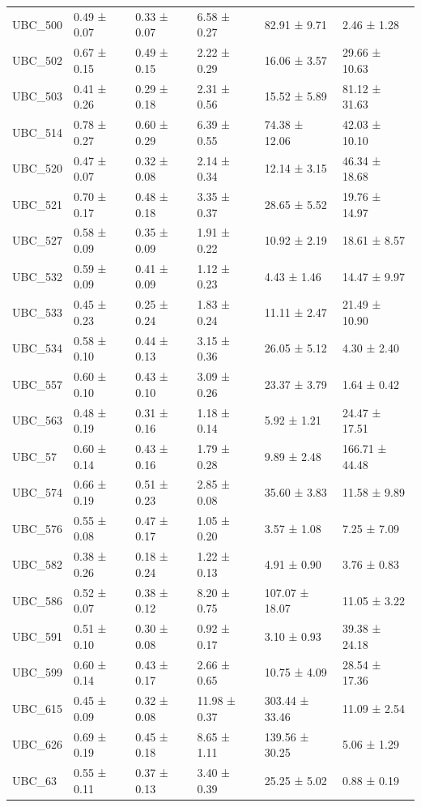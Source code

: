\begin{tabular}{llllll}
UBC_500 & 0.49 ± 0.07 & 0.33 ± 0.07 & 6.58 ± 0.27 & 82.91 ± 9.71 & 2.46 ± 1.28 \\
UBC_502 & 0.67 ± 0.15 & 0.49 ± 0.15 & 2.22 ± 0.29 & 16.06 ± 3.57 & 29.66 ± 10.63 \\
UBC_503 & 0.41 ± 0.26 & 0.29 ± 0.18 & 2.31 ± 0.56 & 15.52 ± 5.89 & 81.12 ± 31.63 \\
UBC_514 & 0.78 ± 0.27 & 0.60 ± 0.29 & 6.39 ± 0.55 & 74.38 ± 12.06 & 42.03 ± 10.10 \\
UBC_520 & 0.47 ± 0.07 & 0.32 ± 0.08 & 2.14 ± 0.34 & 12.14 ± 3.15 & 46.34 ± 18.68 \\
UBC_521 & 0.70 ± 0.17 & 0.48 ± 0.18 & 3.35 ± 0.37 & 28.65 ± 5.52 & 19.76 ± 14.97 \\
UBC_527 & 0.58 ± 0.09 & 0.35 ± 0.09 & 1.91 ± 0.22 & 10.92 ± 2.19 & 18.61 ± 8.57 \\
UBC_532 & 0.59 ± 0.09 & 0.41 ± 0.09 & 1.12 ± 0.23 & 4.43 ± 1.46 & 14.47 ± 9.97 \\
UBC_533 & 0.45 ± 0.23 & 0.25 ± 0.24 & 1.83 ± 0.24 & 11.11 ± 2.47 & 21.49 ± 10.90 \\
UBC_534 & 0.58 ± 0.10 & 0.44 ± 0.13 & 3.15 ± 0.36 & 26.05 ± 5.12 & 4.30 ± 2.40 \\
UBC_557 & 0.60 ± 0.10 & 0.43 ± 0.10 & 3.09 ± 0.26 & 23.37 ± 3.79 & 1.64 ± 0.42 \\
UBC_563 & 0.48 ± 0.19 & 0.31 ± 0.16 & 1.18 ± 0.14 & 5.92 ± 1.21 & 24.47 ± 17.51 \\
UBC_57 & 0.60 ± 0.14 & 0.43 ± 0.16 & 1.79 ± 0.28 & 9.89 ± 2.48 & 166.71 ± 44.48 \\
UBC_574 & 0.66 ± 0.19 & 0.51 ± 0.23 & 2.85 ± 0.08 & 35.60 ± 3.83 & 11.58 ± 9.89 \\
UBC_576 & 0.55 ± 0.08 & 0.47 ± 0.17 & 1.05 ± 0.20 & 3.57 ± 1.08 & 7.25 ± 7.09 \\
UBC_582 & 0.38 ± 0.26 & 0.18 ± 0.24 & 1.22 ± 0.13 & 4.91 ± 0.90 & 3.76 ± 0.83 \\
UBC_586 & 0.52 ± 0.07 & 0.38 ± 0.12 & 8.20 ± 0.75 & 107.07 ± 18.07 & 11.05 ± 3.22 \\
UBC_591 & 0.51 ± 0.10 & 0.30 ± 0.08 & 0.92 ± 0.17 & 3.10 ± 0.93 & 39.38 ± 24.18 \\
UBC_599 & 0.60 ± 0.14 & 0.43 ± 0.17 & 2.66 ± 0.65 & 10.75 ± 4.09 & 28.54 ± 17.36 \\
UBC_615 & 0.45 ± 0.09 & 0.32 ± 0.08 & 11.98 ± 0.37 & 303.44 ± 33.46 & 11.09 ± 2.54 \\
UBC_626 & 0.69 ± 0.19 & 0.45 ± 0.18 & 8.65 ± 1.11 & 139.56 ± 30.25 & 5.06 ± 1.29 \\
UBC_63 & 0.55 ± 0.11 & 0.37 ± 0.13 & 3.40 ± 0.39 & 25.25 ± 5.02 & 0.88 ± 0.19 \\

\end{tabular}
